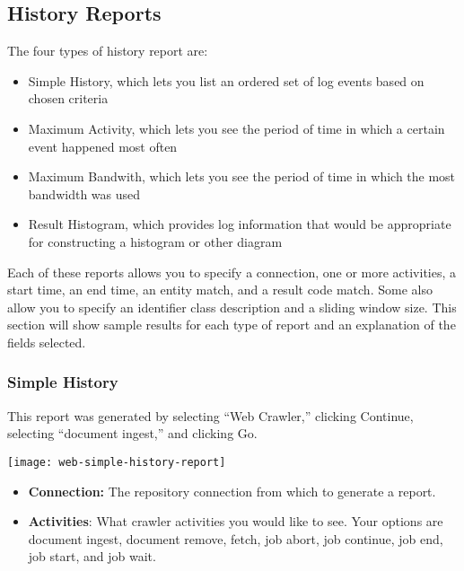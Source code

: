 \begin{changemargin}{1.5in}{0in}
\subsection{History Reports}

The four types of history report are:

\begin{itemize}

\item Simple History, which lets you list an ordered set of log events
based on chosen criteria

\item Maximum Activity, which lets you see the period of time in
which a certain event happened most often

\item Maximum Bandwith, which lets you see the period of time in
which the most bandwidth was used 

\item Result Histogram, which provides log information that would be
appropriate for constructing a histogram or other diagram

\end{itemize}

Each of these reports allows you to specify a connection, one or more
activities, a start time, an end time, an entity match, and a result code
match.  Some also allow you to specify an identifier class description
and a sliding window size. This section will show sample results for
each type of report and an explanation of the fields selected.

\subsubsection{Simple History}

This report was generated by selecting ``Web Crawler,'' 
clicking Continue, selecting ``document ingest,'' and clicking Go.

\texttt{[image: web-simple-history-report]}

\begin{itemize}

\item \textbf{Connection:} The repository connection from which to generate
a report.

\item \textbf{Activities}: What crawler activities you would like to
see.  Your options are document ingest, document remove, fetch, job
abort, job continue, job end, job start, and job wait.


\end{itemize}
\end{changemargin}
